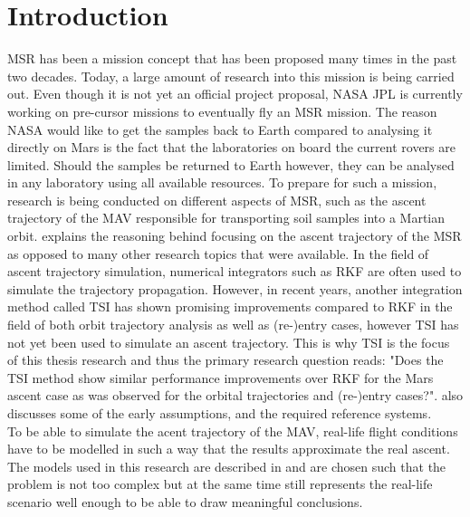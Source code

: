 \chapter{Introduction}  
\label{ch:intro}
\acf{MSR} has been a mission concept that has been proposed many times in the past two decades. Today, a large amount of research into this mission is being carried out. Even though it is not yet an official project proposal, \acf{NASA} \acf{JPL} is currently working on pre-cursor missions to eventually fly an \ac{MSR} mission. The reason \ac{NASA} would like to get the samples back to Earth compared to analysing it directly on Mars is the fact that the laboratories on board the current rovers are limited. Should the samples be returned to Earth however, they can be analysed in any laboratory using all available resources.  To prepare for such a mission, research is being conducted on different aspects of \ac{MSR}, such as the ascent trajectory of the \acf{MAV} responsible for transporting soil samples into a Martian orbit.  explains the reasoning behind focusing on the ascent trajectory of the \ac{MSR} as opposed to many other research topics that were available. In the field of ascent trajectory simulation, numerical integrators such as \acf{RKF} are often used to simulate the trajectory propagation. However, in recent years, another integration method called \acf{TSI} has shown promising improvements compared to \ac{RKF} in the field of both orbit trajectory analysis as well as (re-)entry cases, however \ac{TSI} has not yet been used to simulate an ascent trajectory. This is why \ac{TSI} is the focus of this thesis research and thus the primary research question reads: "Does the \ac{TSI} method show similar performance improvements over \ac{RKF} for the Mars ascent case as was observed for the orbital trajectories and (re-)entry cases?".  also discusses some of the early assumptions, and the required reference systems.\\

To be able to simulate the acent trajectory of the \ac{MAV}, real-life flight conditions have to be modelled in such a way that the results approximate the real ascent. The models used in this research are described in  and are chosen such that the problem is not too complex but at the same time still represents the real-life scenario well enough to be able to draw meaningful conclusions.\\

